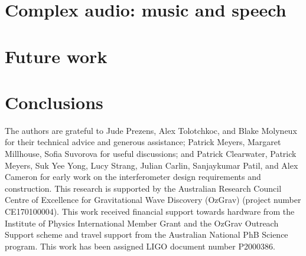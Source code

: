 \documentclass[pra,superscriptaddress,reprint,amsmath,amssymb,nofootinbib]{revtex4-1}
\begin{document}
\section{Complex audio: music and speech}
\label{sec:optical_microphone}



\section{Future work}
\label{sec:future_work}



\section{Conclusions}
\label{sec:conclusions}






\begin{acknowledgments}
The authors are grateful to Jude Prezens, Alex Tolotchkoc, and Blake Molyneux for their technical advice and generous assistance; Patrick Meyers, Margaret Millhouse, Sofia Suvorova for useful discussions; and Patrick Clearwater, Patrick Meyers, Suk Yee Yong, Lucy Strang, Julian Carlin, Sanjaykumar Patil, and Alex Cameron for early work on the interferometer design requirements and construction. 
This research is supported by the Australian Research Council Centre of Excellence for Gravitational Wave Discovery (OzGrav) (project number CE170100004). 
This work received financial support towards hardware from the Institute of Physics International Member Grant and the OzGrav Outreach Support scheme and travel support from the Australian National PhB Science program.
This work has been assigned LIGO document number P2000386. 

\end{acknowledgments}


\appendix



\nocite{*}


\end{document}
